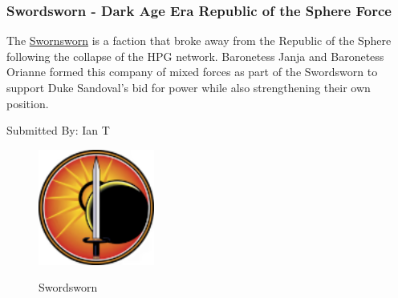\subsubsection{Swordsworn - Dark Age Era Republic of the Sphere Force}

The \href{https://www.sarna.net/wiki/Swordsworn}{Swornsworn} is a faction that broke away from the Republic of the Sphere following the collapse of the HPG network.
Baronetess Janja and Baronetess Orianne formed this company of mixed forces as part of the Swordsworn to support Duke Sandoval's bid for power while also strengthening their own position.

Submitted By: Ian T

\begin{figure}[!h]
  \centering
  \includegraphics[alt='Swordsworn Logo', width=1.5in, height=1.5in]{img/Swordsworn.png}
  \caption*{Swordsworn}
\end{figure}

